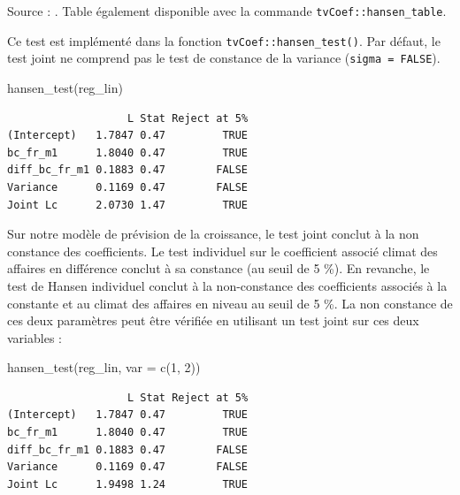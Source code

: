 \documentclass[
  a4paper,
  DIV=11,
  numbers=noendperiod,
  french]{scrartcl}
\newenvironment{Shaded}{\begin{snugshade}}{\end{snugshade}}
\newcommand{\AttributeTok}[1]{\textcolor[rgb]{0.40,0.45,0.13}{#1}}
\newcommand{\DecValTok}[1]{\textcolor[rgb]{0.68,0.00,0.00}{#1}}
\newcommand{\FunctionTok}[1]{\textcolor[rgb]{0.28,0.35,0.67}{#1}}
\newcommand{\NormalTok}[1]{\textcolor[rgb]{0.00,0.23,0.31}{#1}}
\newcommand\1{{\mathds 1}}
\theoremstyle{remark}
\begin{document}
Source : \textcite{hansen1990lagrange}. Table également disponible avec
la commande \texttt{tvCoef::hansen\_table}.

Ce test est implémenté dans la fonction \texttt{tvCoef::hansen\_test()}.
Par défaut, le test joint ne comprend pas le test de constance de la
variance (\texttt{sigma\ =\ FALSE}).

\begin{Shaded}
\begin{Highlighting}[]
\FunctionTok{hansen\_test}\NormalTok{(reg\_lin)}
\end{Highlighting}
\end{Shaded}

\begin{verbatim}
                   L Stat Reject at 5%
(Intercept)   1.7847 0.47         TRUE
bc_fr_m1      1.8040 0.47         TRUE
diff_bc_fr_m1 0.1883 0.47        FALSE
Variance      0.1169 0.47        FALSE
Joint Lc      2.0730 1.47         TRUE
\end{verbatim}

Sur notre modèle de prévision de la croissance, le test joint conclut à
la non constance des coefficients. Le test individuel sur le coefficient
associé climat des affaires en différence conclut à sa constance (au
seuil de 5 \%). En revanche, le test de Hansen individuel conclut à la
non-constance des coefficients associés à la constante et au climat des
affaires en niveau au seuil de 5 \%. La non constance de ces deux
paramètres peut être vérifiée en utilisant un test joint sur ces deux
variables :

\begin{Shaded}
\begin{Highlighting}[]
\FunctionTok{hansen\_test}\NormalTok{(reg\_lin, }\AttributeTok{var =} \FunctionTok{c}\NormalTok{(}\DecValTok{1}\NormalTok{, }\DecValTok{2}\NormalTok{))}
\end{Highlighting}
\end{Shaded}

\begin{verbatim}
                   L Stat Reject at 5%
(Intercept)   1.7847 0.47         TRUE
bc_fr_m1      1.8040 0.47         TRUE
diff_bc_fr_m1 0.1883 0.47        FALSE
Variance      0.1169 0.47        FALSE
Joint Lc      1.9498 1.24         TRUE
\end{verbatim}
\end{document}
